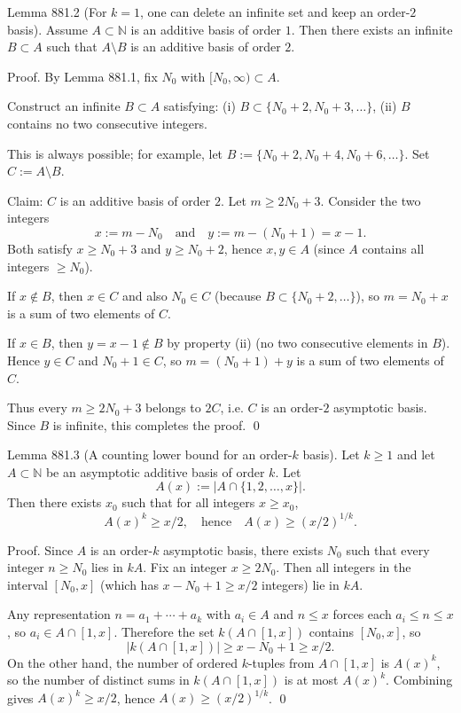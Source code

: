 Lemma 881.2 (For $k=1$, one can delete an infinite set and keep an order-$2$ basis).
Assume $A\subset\mathbb N$ is an additive basis of order $1$. Then there exists an infinite $B\subset A$ such that $A\setminus B$ is an additive basis of order $2$.

Proof.
By Lemma 881.1, fix $N_0$ with $[N_0,\infty)\subset A$.

Construct an infinite $B\subset A$ satisfying:
(i) $B\subset \{N_0+2,N_0+3,\dots\}$,
(ii) $B$ contains no two consecutive integers.

This is always possible; for example, let $B:=\{N_0+2, N_0+4, N_0+6, \dots\}$.
Set $C:=A\setminus B$.

Claim: $C$ is an additive basis of order $2$.
Let $m\ge 2N_0+3$. Consider the two integers
\[x:=m-N_0\quad\text{and}\quad y:=m-(N_0+1)=x-1.\]
Both satisfy $x\ge N_0+3$ and $y\ge N_0+2$, hence $x,y\in A$ (since $A$ contains all integers $\ge N_0$).

If $x\notin B$, then $x\in C$ and also $N_0\in C$ (because $B\subset\{N_0+2,\dots\}$), so $m=N_0+x$ is a sum of two elements of $C$.

If $x\in B$, then $y=x-1\notin B$ by property (ii) (no two consecutive elements in $B$). Hence $y\in C$ and $N_0+1\in C$, so $m=(N_0+1)+y$ is a sum of two elements of $C$.

Thus every $m\ge 2N_0+3$ belongs to $2C$, i.e. $C$ is an order-$2$ asymptotic basis. Since $B$ is infinite, this completes the proof. \qed

Lemma 881.3 (A counting lower bound for an order-$k$ basis).
Let $k\ge 1$ and let $A\subset\mathbb N$ be an asymptotic additive basis of order $k$. Let
\[A(x):=|A\cap\{1,2,\dots,x\}|.\]
Then there exists $x_0$ such that for all integers $x\ge x_0$,
\[A(x)^k \ge x/2,\quad\text{hence}\quad A(x)\ge (x/2)^{1/k}.
\]

Proof.
Since $A$ is an order-$k$ asymptotic basis, there exists $N_0$ such that every integer $n\ge N_0$ lies in $kA$.
Fix an integer $x\ge 2N_0$. Then all integers in the interval $[N_0,x]$ (which has $x-N_0+1\ge x/2$ integers) lie in $kA$.

Any representation $n=a_1+\cdots+a_k$ with $a_i\in A$ and $n\le x$ forces each $a_i\le n\le x$, so $a_i\in A\cap[1,x]$.
Therefore the set $k(A\cap[1,x])$ contains $[N_0,x]$, so
\[|k(A\cap[1,x])|\ge x-N_0+1\ge x/2.\]
On the other hand, the number of ordered $k$-tuples from $A\cap[1,x]$ is $A(x)^k$, so the number of distinct sums in $k(A\cap[1,x])$ is at most $A(x)^k$.
Combining gives $A(x)^k\ge x/2$, hence $A(x)\ge (x/2)^{1/k}$. \qed

